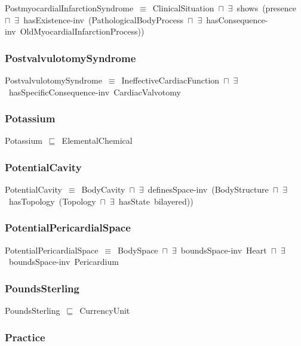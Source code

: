\documentclass{article}
\begin{document}
PostmyocardialInfarctionSyndrome~\ensuremath{\equiv}~ClinicalSituation~\ensuremath{\sqcap}~\ensuremath{\exists}~shows~(presence~\ensuremath{\sqcap}~\ensuremath{\exists}~hasExistence-inv~(PathologicalBodyProcess~\ensuremath{\sqcap}~\ensuremath{\exists}~hasConsequence-inv~OldMyocardialInfarctionProcess))

\subsubsection*{PostvalvulotomySyndrome}

PostvalvulotomySyndrome~\ensuremath{\equiv}~IneffectiveCardiacFunction~\ensuremath{\sqcap}~\ensuremath{\exists}~hasSpecificConsequence-inv~CardiacValvotomy

\subsubsection*{Potassium}

Potassium~\ensuremath{\sqsubseteq}~ElementalChemical~

\subsubsection*{PotentialCavity}

PotentialCavity~\ensuremath{\equiv}~BodyCavity~\ensuremath{\sqcap}~\ensuremath{\exists}~definesSpace-inv~(BodyStructure~\ensuremath{\sqcap}~\ensuremath{\exists}~hasTopology~(Topology~\ensuremath{\sqcap}~\ensuremath{\exists}~hasState~bilayered))

\subsubsection*{PotentialPericardialSpace}

PotentialPericardialSpace~\ensuremath{\equiv}~BodySpace~\ensuremath{\sqcap}~\ensuremath{\exists}~boundsSpace-inv~Heart~\ensuremath{\sqcap}~\ensuremath{\exists}~boundsSpace-inv~Pericardium

\subsubsection*{PoundsSterling}

PoundsSterling~\ensuremath{\sqsubseteq}~CurrencyUnit~

\subsubsection*{Practice}
\end{document}
